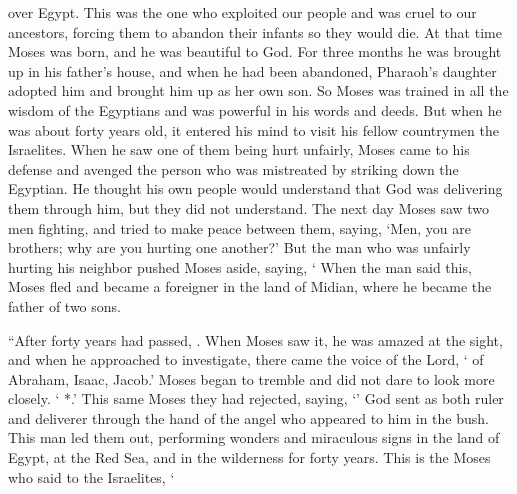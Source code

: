 {{{over
Egypt}}.
This
was the one who exploited
our
people
and was cruel
to our ancestors,
forcing
them to abandon
their
infants
so
they would die.
At
that time
Moses
was born,
and
he was
beautiful
to God.
For three
months
he was brought up
in
his father’s
house,
and
when
he
had been abandoned,
Pharaoh’s
daughter
adopted
him
and
brought
him
up
as
her own
son.
So
Moses
was trained
in all
the wisdom
of the Egyptians
and
was
powerful
in
his
words
and
deeds.
But
when
he was about
forty
years old,
it entered
his
mind
to visit
his
fellow countrymen
the Israelites.
When
he saw
one of them
being hurt unfairly,
Moses came to
his defense
and
avenged
the person who was mistreated
by striking down
the Egyptian.
He thought
his own people
would understand
that
God
was delivering
them
through
him,
but
they did
not
understand.
The next
day
Moses saw
two men
fighting,
and
tried
to make peace
between them,
saying,
‘Men,
you are
brothers;
why
are you hurting
one another?’
But
the man who was unfairly hurting
his neighbor
pushed
Moses
aside,
saying, ‘{}
When
the man said
this,
Moses
fled
and
became
a foreigner
in
the land
of Midian,
where
he became the father
of two
sons.
\par }{\PP {}“After forty
years
had passed,
{}
{}.
When
Moses
saw
it, he was amazed
at the sight,
and
when he
approached
to investigate,
there came
the voice
of
the Lord,
‘{}
{}
of Abraham,
Isaac,
{}
Jacob.’ Moses
began to tremble
and
did
not
dare
to look more closely.
 ‘{}
*.’
This
same Moses
they had rejected,
saying, ‘{}’
God
sent
as both
ruler
and
deliverer
through the hand
of the angel
who appeared
to him
in
the bush.
This man
led
them
out,
performing
wonders
and
miraculous signs
in
the land of Egypt,
at
the Red
Sea,
and
in
the wilderness
for forty
years.
This
is
the Moses
who said
to the Israelites, ‘{}}
